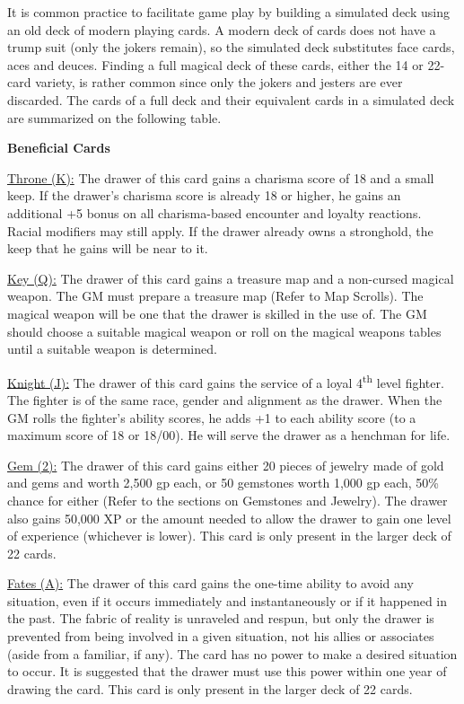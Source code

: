 \begin{multicols}{2}
It is common practice to facilitate game play by building a simulated deck using an old deck of modern playing cards.  A modern deck of cards does not have a trump suit (only the jokers remain), so the simulated deck substitutes face cards, aces and deuces.  Finding a full magical deck of these cards, either the 14 or 22-card variety, is rather common since only the jokers and jesters are ever discarded.  The cards of a full deck and their equivalent cards in a simulated deck are summarized on the following table. 

\vspace{1em}

\noindent \textbf{Beneficial Cards}

\vspace{1em}

\underline{Throne (K):} The drawer of this card gains a charisma score of 18 and a small keep.  If the drawer's charisma score is already 18 or higher, he gains an additional +5 bonus on all charisma-based encounter and loyalty reactions.  Racial modifiers may still apply.  If the drawer already owns a stronghold, the keep that he gains will be near to it.

\underline{Key (Q):} The drawer of this card gains a treasure map and a non-cursed magical weapon.  The GM must prepare a treasure map (Refer to Map Scrolls).  The magical weapon will be one that the drawer is skilled in the use of.  The GM should choose a suitable magical weapon or roll on the magical weapons tables until a suitable weapon is determined.

\underline{Knight (J):} The drawer of this card gains the service of a loyal 4\textsuperscript{th} level fighter.  The fighter is of the same race, gender and alignment as the drawer. When the GM rolls the fighter's ability scores, he adds +1 to each ability score (to a maximum score of 18 or 18/00).  He will serve the drawer as a henchman for life. 

\underline{Gem (2):} The drawer of this card gains either 20 pieces of jewelry made of gold and gems and worth 2,500 gp each, or 50 gemstones worth 1,000 gp each, 50\% chance for either (Refer to the sections on Gemstones and Jewelry).  The drawer also gains 50,000 XP or the amount needed to allow the drawer to gain one level of experience (whichever is lower).  This card is only present in the larger deck of 22 cards.

\underline{Fates (A):} The drawer of this card gains the one-time ability to avoid any situation, even if it occurs immediately and instantaneously or if it happened in the past.  The fabric of reality is unraveled and respun, but only the drawer is prevented from being involved in a given situation, not his allies or associates (aside from a familiar, if any).  The card has no power to make a desired situation to occur.  It is suggested that the drawer must use this power within one year of drawing the card.  This card is only present in the larger deck of 22 cards.


\end{multicols}
